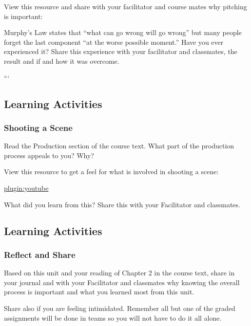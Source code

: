 \documentclass[
]{book}
\begin{document}
View this resource and share with your facilitator and course mates why pitching is important:

Murphy's Law states that ``what can go wrong will go wrong'' but many people forget the last component ``at the worse possible moment.'' Have you ever experienced it? Share this experience with your facilitator and classmates, the result and if and how it was overcome.

```

\hypertarget{learning-activities-5}{%
\subsection*{Learning Activities}\label{learning-activities-5}}

\begin{reflect}
\hypertarget{shooting-a-scene}{%
\subsubsection*{Shooting a Scene}\label{shooting-a-scene}}

Read the Production section of the course text.
What part of the production process appeals to you? Why?

View this resource to get a feel for what is involved in shooting a scene:

\href{https://www.youtube.com/watch?v=y9_LW5H2EC4}{plugin:youtube}

What did you learn from this? Share this with your Facilitator and classmates.
\end{reflect}

\hypertarget{learning-activities-6}{%
\subsection*{Learning Activities}\label{learning-activities-6}}

\begin{assessment}
\hypertarget{reflect-and-share}{%
\subsubsection*{Reflect and Share}\label{reflect-and-share}}

Based on this unit and your reading of Chapter 2 in the course text, share in your journal and with your Facilitator and classmates why knowing the overall process is important and what you learned most from this unit.

Share also if you are feeling intimidated. Remember all but one of the graded assignments will be done in teams so you will not have to do it all alone.
\end{assessment}
\end{document}

